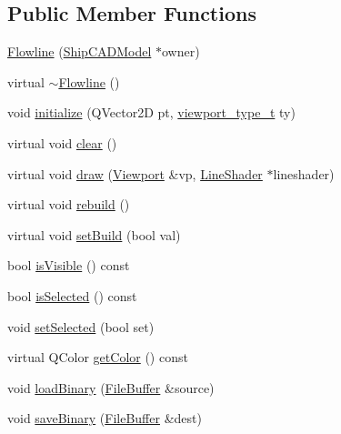 \subsection*{Public Member Functions}
\begin{DoxyCompactItemize}
\item 
\hyperlink{classShipCAD_1_1Flowline_aee316a748229f5abafac72ebe3af1e41}{Flowline} (\hyperlink{classShipCAD_1_1ShipCADModel}{Ship\+C\+A\+D\+Model} $\ast$owner)
\item 
virtual \hyperlink{classShipCAD_1_1Flowline_a77555e4dc8db9f99b684ea60e2a1a88e}{$\sim$\+Flowline} ()
\item 
void \hyperlink{classShipCAD_1_1Flowline_a58832002dec0b6ee8cb59e2fcc33f056}{initialize} (Q\+Vector2D pt, \hyperlink{namespaceShipCAD_aeeeb05810f2e31ef89fd4ac6b6ba9c0a}{viewport\+\_\+type\+\_\+t} ty)
\item 
virtual void \hyperlink{classShipCAD_1_1Flowline_ac3bbbbd3d853214bb9c9feeb7a12314d}{clear} ()
\item 
virtual void \hyperlink{classShipCAD_1_1Flowline_a8b43ac96514f62c6fb0db938eccd0d44}{draw} (\hyperlink{classShipCAD_1_1Viewport}{Viewport} \&vp, \hyperlink{classShipCAD_1_1LineShader}{Line\+Shader} $\ast$lineshader)
\item 
virtual void \hyperlink{classShipCAD_1_1Flowline_a28e5d73316c6d2c8005428669a9e9b97}{rebuild} ()
\item 
virtual void \hyperlink{classShipCAD_1_1Flowline_ad148400a3e53b2368b37c2c7f50ec1b7}{set\+Build} (bool val)
\item 
bool \hyperlink{classShipCAD_1_1Flowline_a86839bd40eccaef22050ba6f15aec361}{is\+Visible} () const 
\item 
bool \hyperlink{classShipCAD_1_1Flowline_a17a5a1693579fab85df64dac8f7a5fa8}{is\+Selected} () const 
\item 
void \hyperlink{classShipCAD_1_1Flowline_a4ade2663ee4102e0eff8920eeeaf8b37}{set\+Selected} (bool set)
\item 
virtual Q\+Color \hyperlink{classShipCAD_1_1Flowline_a546cee93d649cc3514bf2fcd19694ecf}{get\+Color} () const 
\item 
void \hyperlink{classShipCAD_1_1Flowline_a2910767b8fc3beb218d84bbb9d35fd7d}{load\+Binary} (\hyperlink{classShipCAD_1_1FileBuffer}{File\+Buffer} \&source)
\item 
void \hyperlink{classShipCAD_1_1Flowline_aeb29f59014b7df1e44dd6bda92dbc95d}{save\+Binary} (\hyperlink{classShipCAD_1_1FileBuffer}{File\+Buffer} \&dest)
\end{DoxyCompactItemize}
